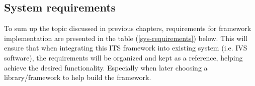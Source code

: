 \documentclass[main.tex]{subfiles}
\begin{document}
    
    


\subsection{System requirements}

To sum up the topic discussed in previous chapters, requirements for framework implementation
are presented in the table (\ref{sys-requirements}) below. This will ensure that when
integrating this ITS framework into existing system (i.e. IVS software), the requirements will
be organized and kept as a reference, helping achieve the desired functionality. Especially
when later choosing a library/framework to help build the framework. 
\end{document}
